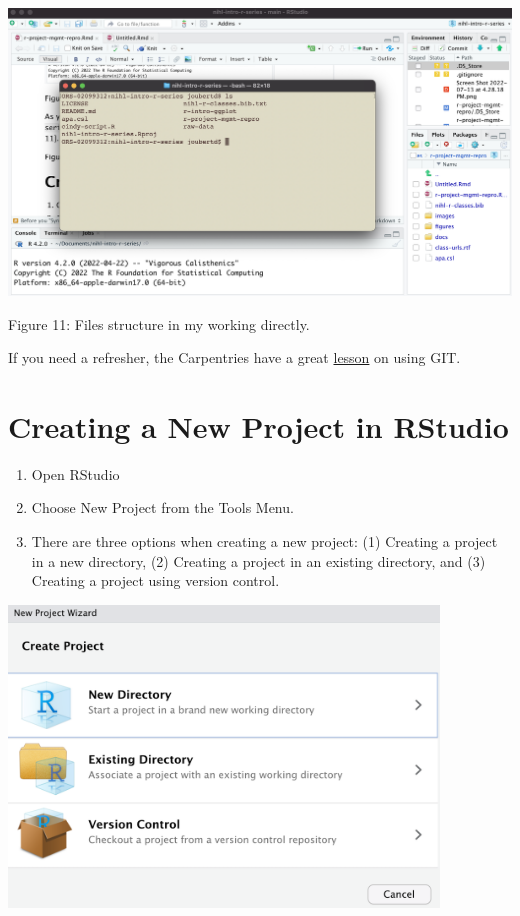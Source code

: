 \documentclass[
]{article}
\providecommand{\tightlist}{%
  \setlength{\itemsep}{0pt}\setlength{\parskip}{0pt}}
\begin{document}
\includegraphics[width=6.5in,height=\textheight]{images/git-02.png}

Figure 11: Files structure in my working directly.

If you need a refresher, the Carpentries have a great
\href{https://swcarpentry.github.io/git-novice/}{lesson} on using GIT.

\hypertarget{creating-a-new-project-in-rstudio}{%
\section{Creating a New Project in
RStudio}\label{creating-a-new-project-in-rstudio}}

\begin{enumerate}
\def\labelenumi{\arabic{enumi}.}
\tightlist
\item
  Open RStudio
\item
  Choose New Project from the Tools Menu.
\item
  There are three options when creating a new project: (1) Creating a
  project in a new directory, (2) Creating a project in an existing
  directory, and (3) Creating a project using version control.
\end{enumerate}

\includegraphics[width=4.5in,height=\textheight]{images/new-project-01.png}
\end{document}
